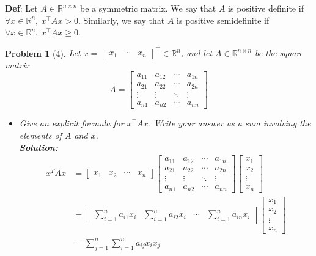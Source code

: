 \documentclass[11pt]{article}
\theoremstyle{quest}
\newtheorem*{question}{Problem}
\begin{document}
\noindent
\textbf{Def}: Let $A \in \mathbb{R}^{n \times n}$ be a symmetric matrix. We say that $A$ is positive definite if $\forall x\in \mathbb{R}^n,\ x^\top Ax > 0$. Similarly, we say that $A$ is positive semidefinite if $\forall x \in \mathbb{R}^n,\ x^\top Ax \geq 0$.

\begin{question}[4]
Let $x = \begin{bmatrix}x_1 & \cdots & x_n\end{bmatrix}^\top \in \mathbb{R}^n$, and let $A \in \mathbb{R}^{n \times n}$ be the square matrix
\begin{equation*}
A = \begin{bmatrix}
  a_{11} & a_{12} & \cdots & a_{1n} \\
  a_{21} & a_{22} & \cdots & a_{2n} \\
  \vdots  & \vdots  & \ddots & \vdots  \\
  a_{n1} & a_{n2} & \cdots & a_{nn}
\end{bmatrix}
\end{equation*}

\begin{itemize}
\item[(a)]
Give an explicit formula for $x^\top A x$. Write your answer as a sum involving the elements of $A$ and $x$. \\
\vspace{12pt}
\textbf{Solution:}
\begin{align*}
x^{T}Ax &= \begin{bmatrix}x_1&x_2&\cdots&x_n\end{bmatrix}\begin{bmatrix}a_{11}&a_{12}&\cdots&a_{1n}\\a_{21}&a_{22}&\cdots&a_{2n}\\\vdots&\vdots&\ddots&\vdots\\a_{n1}&a_{n2}&\cdots&a_{nn}\end{bmatrix}\begin{bmatrix}x_1\\x_2\\\vdots\\x_n\end{bmatrix}\\
&= \begin{bmatrix}\sum_{i=1}^na_{i1}x_i&\sum_{i=1}^na_{i2}x_i&\cdots&\sum_{i=1}^na_{in}x_i\end{bmatrix}\begin{bmatrix}x_1\\x_2\\\vdots\\x_n\end{bmatrix}\\
&= \sum_{j=1}^n \sum_{i=1}^n a_{ij}x_ix_j
\end{align*}
\vspace{1in}


\end{itemize}
\end{question}
\end{document}
